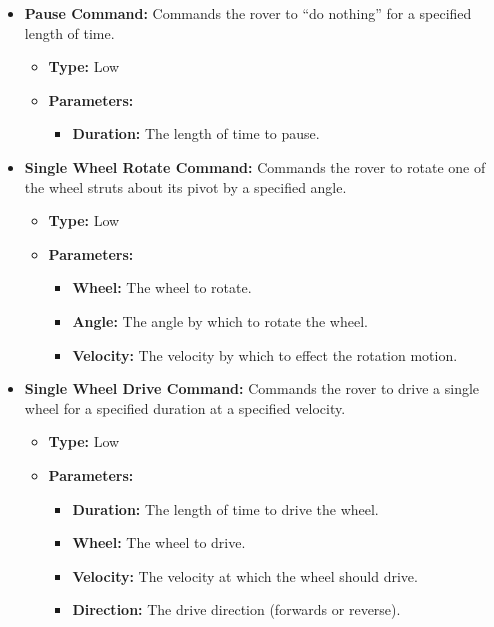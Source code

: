         \begin{itemize}
          \item \textbf{Pause Command:} Commands the rover to ``do nothing'' for a specified length of time.
          \begin{itemize}
            \item \textbf{Type:} Low
            \item \textbf{Parameters:}
            \begin{itemize}
              \item \textbf{Duration:} The length of time to pause.
            \end{itemize}
          \end{itemize}
          
          \item \textbf{Single Wheel Rotate Command:} Commands the rover to rotate one of the wheel struts about its pivot by a specified angle.
          \begin{itemize}
            \item \textbf{Type:} Low
            \item \textbf{Parameters:}
            \begin{itemize}
              \item \textbf{Wheel:} The wheel to rotate.
              \item \textbf{Angle:} The angle by which to rotate the wheel.
              \item \textbf{Velocity:} The velocity by which to effect the rotation motion.
            \end{itemize}
          \end{itemize}
        
          \item \textbf{Single Wheel Drive Command:} Commands the rover to drive a single wheel for a specified duration at a specified velocity.
          \begin{itemize}
            \item \textbf{Type:} Low
            \item \textbf{Parameters:}
            \begin{itemize}
              \item \textbf{Duration:} The length of time to drive the wheel.
              \item \textbf{Wheel:} The wheel to drive.
              \item \textbf{Velocity:} The velocity at which the wheel should drive.
              \item \textbf{Direction:} The drive direction (forwards or reverse).
            \end{itemize}
          \end{itemize}
          

\end{itemize}
